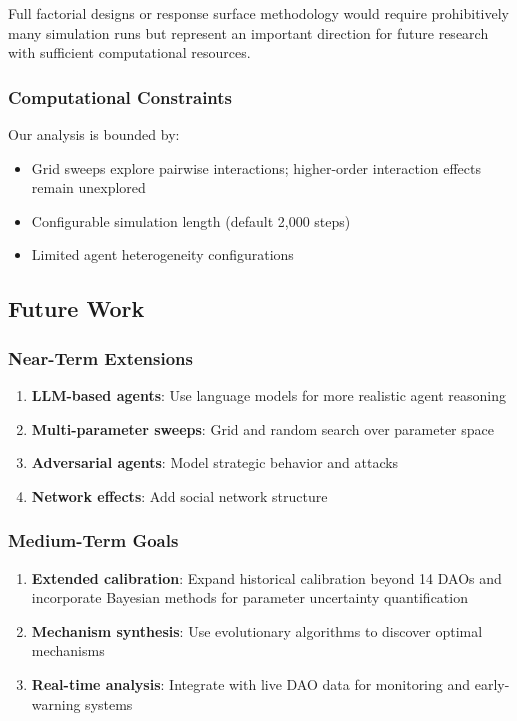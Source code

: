 Full factorial designs or response surface methodology would require prohibitively many simulation runs but represent an important direction for future research with sufficient computational resources.

\subsubsection{Computational Constraints}

Our analysis is bounded by:

\begin{itemize}
    \item Grid sweeps explore pairwise interactions; higher-order interaction effects remain unexplored
    \item Configurable simulation length (default 2{,}000 steps)
    \item Limited agent heterogeneity configurations
\end{itemize}

\subsection{Future Work}

\subsubsection{Near-Term Extensions}

\begin{enumerate}
    \item \textbf{LLM-based agents}: Use language models for more realistic agent reasoning
    \item \textbf{Multi-parameter sweeps}: Grid and random search over parameter space
    \item \textbf{Adversarial agents}: Model strategic behavior and attacks
    \item \textbf{Network effects}: Add social network structure
\end{enumerate}

\subsubsection{Medium-Term Goals}

\begin{enumerate}
    \item \textbf{Extended calibration}: Expand historical calibration beyond 14 DAOs and incorporate Bayesian methods for parameter uncertainty quantification
    \item \textbf{Mechanism synthesis}: Use evolutionary algorithms to discover optimal mechanisms
    \item \textbf{Real-time analysis}: Integrate with live DAO data for monitoring and early-warning systems
\end{enumerate}

